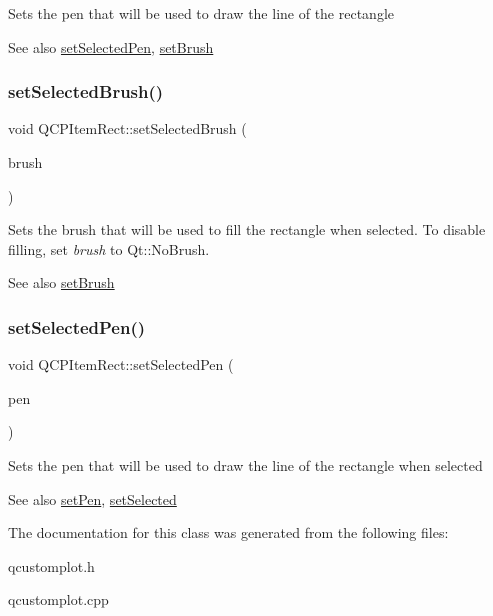 Sets the pen that will be used to draw the line of the rectangle

\begin{DoxySeeAlso}{See also}
\hyperlink{classQCPItemRect_a52a1bcb2dc753a538e406a2ba3cf21ce}{set\+Selected\+Pen}, \hyperlink{classQCPItemRect_abbd4e346a03513ee466afc25d9c75446}{set\+Brush} 
\end{DoxySeeAlso}
\mbox{\label{classQCPItemRect_abd1792859844118dedee86223cede7af}} 
\subsubsection{\texorpdfstring{set\+Selected\+Brush()}{setSelectedBrush()}}
{\footnotesize\ttfamily void Q\+C\+P\+Item\+Rect\+::set\+Selected\+Brush (\begin{DoxyParamCaption}\item[{const Q\+Brush \&}]{brush }\end{DoxyParamCaption})}

Sets the brush that will be used to fill the rectangle when selected. To disable filling, set {\itshape brush} to Qt\+::\+No\+Brush.

\begin{DoxySeeAlso}{See also}
\hyperlink{classQCPItemRect_abbd4e346a03513ee466afc25d9c75446}{set\+Brush} 
\end{DoxySeeAlso}
\mbox{\label{classQCPItemRect_a52a1bcb2dc753a538e406a2ba3cf21ce}} 
\subsubsection{\texorpdfstring{set\+Selected\+Pen()}{setSelectedPen()}}
{\footnotesize\ttfamily void Q\+C\+P\+Item\+Rect\+::set\+Selected\+Pen (\begin{DoxyParamCaption}\item[{const Q\+Pen \&}]{pen }\end{DoxyParamCaption})}

Sets the pen that will be used to draw the line of the rectangle when selected

\begin{DoxySeeAlso}{See also}
\hyperlink{classQCPItemRect_a483c0da5a17e1646cd17ddea2c124e7d}{set\+Pen}, \hyperlink{classQCPAbstractItem_a203de94ad586cc44d16c9565f49d3378}{set\+Selected} 
\end{DoxySeeAlso}


The documentation for this class was generated from the following files\+:\begin{DoxyCompactItemize}
\item 
qcustomplot.\+h\item 
qcustomplot.\+cpp\end{DoxyCompactItemize}
